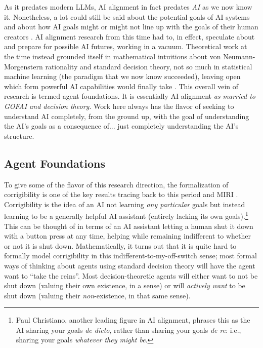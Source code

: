 As it predates modern LLMs, AI alignment in fact predates \emph{AI} as we now
know it. Nonetheless, a lot could still be said about the potential goals of AI
systems and about how AI goals might or might not line up with the goals of
their human creators
\cite{bostrom2014superintelligence,omohundro2008drives,yudkowsky2008factor}. AI
alignment research from this time had to, in effect, speculate about and
prepare for possible AI futures, working in a vacuum. Theoretical work at the
time instead grounded itself in mathematical intuitions about von
Neumann-Morgenstern rationality \cite{von1944games} and standard decision
theory, not so much in statistical machine learning (the paradigm that we now
know succeeded), leaving open which form powerful AI capabilities would finally
take \cite{soares2015corrigibility}. This overall vein of research is termed
agent foundations. It is essentially AI alignment \emph{as married to GOFAI and
decision theory}. Work here always has the flavor of seeking to understand AI
completely, from the ground up, with the goal of understanding the AI's goals
as a consequence of... just completely understanding the AI's structure.

\subsection{Agent Foundations}
To give some of the flavor of this research direction, the formalization of
corrigibility is one of the key results tracing back to this period and MIRI
\cite{soares2015corrigibility}. Corrigibility is the idea of an AI not learning
\emph{any particular} goals but instead learning to be a generally helpful AI
assistant (entirely lacking its own goals).\footnote{Paul Christiano, another
leading figure in AI alignment, phrases this as the AI sharing your goals
\emph{de dicto}, rather than sharing your goals \emph{de re}: i.e., sharing
your goals \emph{whatever they might be}.} This can be thought of in terms of
an AI assistant letting a human shut it down with a button press at any time,
helping while remaining indifferent to whether or not it is shut down.
Mathematically, it turns out that it is quite hard to formally model
corrigibility in this indifferent-to-my-off-switch sense; most formal ways of
thinking about agents using standard decision theory will have the agent want
to ``take the reins''. Most decision-theoretic agents will either want to not
be shut down (valuing their own existence, in a sense) or will \emph{actively
want} to be shut down (valuing their \emph{non}-existence, in that same sense).

